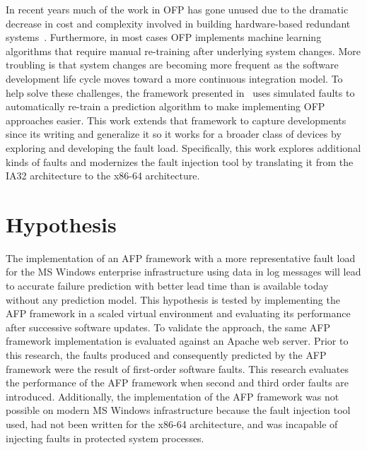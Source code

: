 In recent years much of the work in \ac{OFP} has gone unused due to the
dramatic decrease in cost and complexity involved in building hardware-based
redundant systems~\cite{irrera2015}.  Furthermore, in most cases \ac{OFP}
implements machine learning algorithms that require manual re-training after
underlying system changes.  More troubling is that system changes are becoming
more frequent as the software development life cycle moves toward a more
continuous integration model.  To help solve these challenges, the framework
presented in~\cite{irrera2015} uses simulated faults to automatically re-train
a prediction algorithm to make implementing \ac{OFP} approaches easier.  This
work extends that framework to capture developments since its writing and
generalize it so it works for a broader class of devices by exploring and
developing the fault load.  Specifically, this work explores additional kinds
of faults and modernizes the fault injection tool by translating it from the
IA32 architecture to the x86-64 architecture.

\section{Hypothesis}
The implementation of an \ac{AFP} framework with a more representative fault
load for the \ac{MS} Windows enterprise infrastructure using data in log
messages will lead to accurate failure prediction with better lead time than is
available today without any prediction model.  This hypothesis is tested by
implementing the \ac{AFP} framework in a scaled virtual environment and
evaluating its performance after successive software updates.  To validate the
approach, the same \ac{AFP} framework implementation is evaluated against an
Apache web server.  Prior to this research, the faults produced and
consequently predicted by the \ac{AFP} framework were the result of first-order
software faults.  This research evaluates the performance of the \ac{AFP}
framework when second and third order faults are introduced.  Additionally, the
implementation of the \ac{AFP} framework was not possible on modern \ac{MS}
Windows infrastructure because the fault injection tool used, had not been
written for the x86-64 architecture, and was incapable of injecting faults in
protected system processes.

